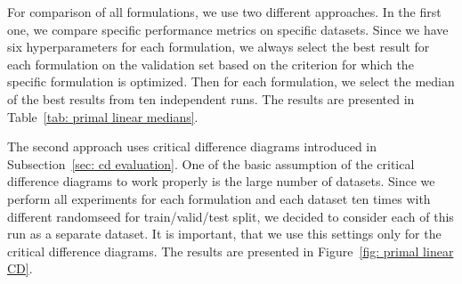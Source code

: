 For comparison of all formulations, we use two different approaches. In the first one, we compare specific performance metrics on specific datasets. Since we have six hyperparameters for each formulation, we always select the best result for each formulation on the validation set based on the criterion for which the specific formulation is optimized. Then for each formulation, we select the median of the best results from ten independent runs. The results are presented in Table~\ref{tab: primal linear medians}.

The second approach uses critical difference diagrams introduced in Subsection~\ref{sec: cd evaluation}. One of the basic assumption of the critical difference diagrams to work properly is the large number of datasets. Since we perform all experiments for each formulation and each dataset ten times with different randomseed for train/valid/test split, we decided to consider each of this run as a separate dataset. It is important, that we use this settings only for the critical difference diagrams. The results are presented in Figure~\ref{fig: primal linear CD}.

